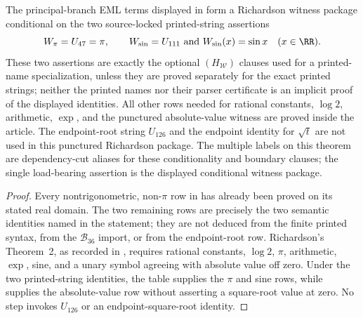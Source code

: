 \begin{theorem}
\label{thm:no-core-only-richardson-translation}
\label{prop:printed-witness-certificate-boundary}
\label{thm:printed-richardson-witnesses-interface}
\label{thm:exact-richardson-witness-conditionality}
\label{thm:printed-string-real-domain-upgrade-criterion}
\label{thm:finite-eml-richardson-trichotomy}
\label{thm:no-unconditional-printed-root-richardson-instance}
\label{thm:separation-is-interface-only}
The principal-branch EML terms displayed in
 form a Richardson witness package conditional
on the two source-locked printed-string assertions
\[
  W_{\pi}=U_{47}=\pi,
  \qquad
  W_{\sin}=U_{111}\text{ and }W_{\sin}(x)=\sin x\quad(x\in\RR).
\]
These two assertions are exactly the optional \((H_{\mathcal W})\) clauses used
for a printed-name specialization, unless they are proved separately for the
exact printed strings; neither the printed names nor their parser certificate is
an implicit proof of the displayed identities.  All other rows needed
for rational constants, \(\log2\), arithmetic, \(\exp\), and the punctured
absolute-value witness are proved inside the article.  The endpoint-root string
\(U_{126}\) and the endpoint identity for \(\sqrt t\) are not used in this
punctured Richardson package.  The multiple labels on this theorem are
dependency-cut aliases for these conditionality and boundary clauses; the single
load-bearing assertion is the displayed conditional witness package.
\end{theorem}

\begin{proof}
Every nontrigonometric, non-\(\pi\) row in  has
already been proved on its stated real domain.  The two remaining rows are
precisely the two semantic identities named in the statement; they are not
deduced from the finite printed syntax, from the \(\mathcal B_{36}\) import, or
from the endpoint-root row.  Richardson's
Theorem~2, as recorded in , requires rational
constants, \(\log2\), \(\pi\), arithmetic, \(\exp\), sine, and a unary symbol
agreeing with absolute value off zero.  Under the two printed-string identities,
the table supplies the \(\pi\) and sine rows, while
 supplies the absolute-value row without
asserting a square-root value at zero.  No step invokes \(U_{126}\) or an
endpoint-square-root identity.
\end{proof}

